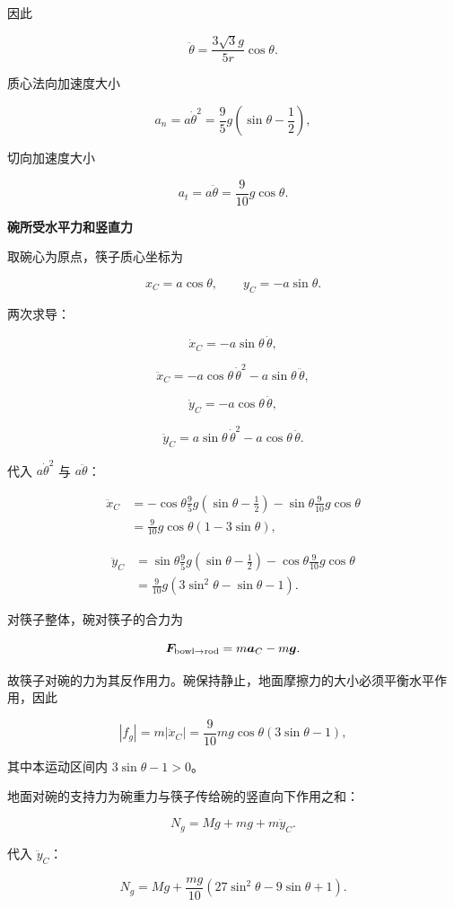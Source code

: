 \documentclass[12pt,a4paper,UTF8]{ctexart}
\begin{document}
因此

\[\boxed{
\ddot\theta=\frac{3\sqrt3g}{5r}\cos\theta
}.\]

质心法向加速度大小

\[a_n=a\dot\theta^2
=\frac9{5}g\left(\sin\theta-\frac12\right),\]

切向加速度大小

\[a_t=a\ddot\theta
=\frac9{10}g\cos\theta.\]

\textbf{碗所受水平力和竖直力}

取碗心为原点，筷子质心坐标为

\[x_C=a\cos\theta,\qquad y_C=-a\sin\theta.\]

两次求导：

\[\dot x_C=-a\sin\theta\,\dot\theta,\]

\[\ddot x_C=-a\cos\theta\,\dot\theta^2-a\sin\theta\,\ddot\theta,\]

\[\dot y_C=-a\cos\theta\,\dot\theta,\]

\[\ddot y_C=a\sin\theta\,\dot\theta^2-a\cos\theta\,\ddot\theta.\]

代入 \(a\dot\theta^2\) 与 \(a\ddot\theta\)：

\[\begin{aligned}
\ddot x_C
&=-\cos\theta\frac95g\left(\sin\theta-\frac12\right)
-\sin\theta\frac9{10}g\cos\theta\\
&=\frac9{10}g\cos\theta(1-3\sin\theta),
\end{aligned}\]

\[\begin{aligned}
\ddot y_C
&=\sin\theta\frac95g\left(\sin\theta-\frac12\right)
-\cos\theta\frac9{10}g\cos\theta\\
&=\frac9{10}g(3\sin^2\theta-\sin\theta-1).
\end{aligned}\]

对筷子整体，碗对筷子的合力为

\[\bm F_{\rm bowl\to rod}=m\bm a_C-m\bm g.\]

故筷子对碗的力为其反作用力。碗保持静止，地面摩擦力的大小必须平衡水平作用，因此

\[|f_g|=m|\ddot x_C|
=\frac9{10}mg\cos\theta(3\sin\theta-1),\]

其中本运动区间内 \(3\sin\theta-1>0\)。

地面对碗的支持力为碗重力与筷子传给碗的竖直向下作用之和：

\[N_g=Mg+mg+m\ddot y_C.\]

代入 \(\ddot y_C\)：

\[\boxed{
N_g=Mg+\frac{mg}{10}\left(27\sin^2\theta-9\sin\theta+1\right)
}.\]
\end{document}
